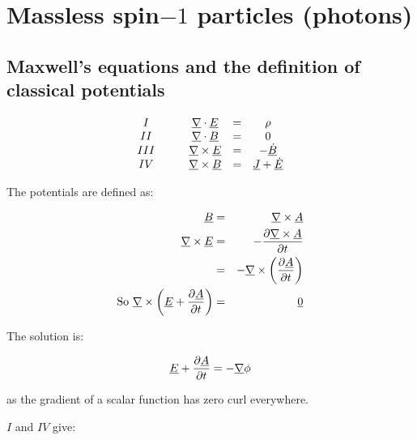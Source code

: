 \chapter{Massless spin\texorpdfstring{$-1$}{1} particles (photons)}

\section{Maxwell's equations and the definition of classical potentials}

\[
  \begin{array}{ccccc}
  I   & \quad & \underline{\nabla}\cdot\underline{E}  & = & \rho \\
  II  &       & \underline{\nabla}\cdot\underline{B}  & = & 0 \\
  III &       & \underline{\nabla}\times\underline{E} & = & -\underline{\dot{B}} \\
  IV  &       & \underline{\nabla}\times\underline{B} & = & \underline{J} + \underline{\dot{E}}
  \end{array}
\]

The potentials are defined as:

\begin{eqnarray*}
  \underline{B} & = & \underline{\nabla}\times\underline{A} \\
  \underline{\nabla}\times\underline{E} & = & -\frac{\partial \underline{\nabla}\times\underline{A}}{\partial t} \\
  & = & -\underline{\nabla}\times{\left(\frac{\partial \underline{A}}{\partial t}\right)} \\
  \textrm{So } \underline{\nabla}\times{\left(\underline{E} + \frac{\partial\underline{A}}{\partial t}\right)} & = & \underline{0}
\end{eqnarray*}

The solution is:

\[
  \underline{E} + \frac{\partial \underline{A}}{\partial t} = -\underline{\nabla}\phi
\]

as the gradient of a scalar function has zero curl everywhere.

$I$ and $IV$ give:

